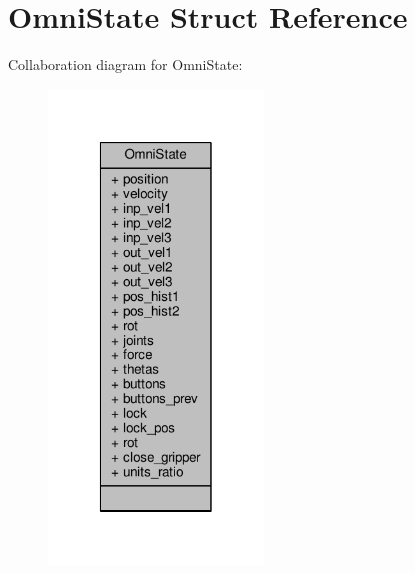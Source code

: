 \hypertarget{struct_omni_state}{\section{Omni\-State Struct Reference}
\label{struct_omni_state}
}


Collaboration diagram for Omni\-State\-:
\nopagebreak
\begin{figure}[H]
\begin{center}
\leavevmode
\includegraphics[width=162pt]{struct_omni_state__coll__graph}
\end{center}
\end{figure}
